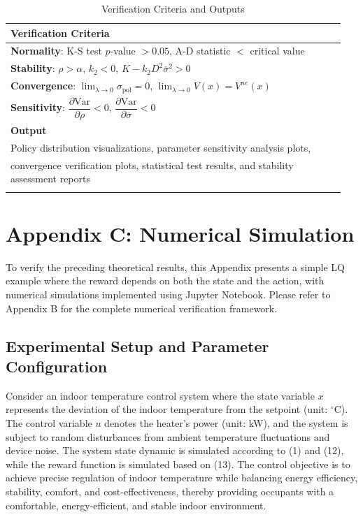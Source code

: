 \documentclass[onecolumn, journal]{IEEEtran} %
\begin{document}
	\newpage
	\begin{table}[h!]
		\centering
		\caption{Verification Criteria and Outputs}
		\label{tab:verification-criteria}
		\footnotesize
		\begin{tabular}{@{}p{0.95\linewidth}@{}}
			\toprule
			\textbf{Verification Criteria}\\
			\midrule
			\textbf{Normality}: K-S test $p$-value $> 0.05$, A-D statistic $<$ critical value\\
			\textbf{Stability}: $\rho > \alpha$, $k_2 < 0$, $K - k_2 D^2 \overline\sigma^2 > 0$\\
			\textbf{Convergence}: $\lim_{\lambda \to 0} \sigma_{\text{pol}} = 0$, $\lim_{\lambda \to 0} V(x) = V^{ne}(x)$\\
			\textbf{Sensitivity}: $\dfrac{\partial \mathrm{Var}}{\partial \rho} < 0$, $\dfrac{\partial \mathrm{Var}}{\partial \overline{\sigma}} < 0$\\
			\midrule
			\textbf{Output}\\
			\midrule
			Policy distribution visualizations, parameter sensitivity analysis plots, \\
			convergence verification plots, statistical test results, and stability assessment reports\\\\
			\bottomrule
		\end{tabular}
	\end{table}
	
	\section*{Appendix C: Numerical Simulation}
	To verify the preceding theoretical results, this Appendix presents a simple LQ example where the reward depends on both the state and the action, with numerical simulations implemented using Jupyter Notebook. Please refer to Appendix B for the complete numerical verification framework.
	
	\subsection{Experimental Setup and Parameter Configuration}
	Consider an indoor temperature control system where the state variable $x$ represents the deviation of the indoor temperature from the setpoint (unit: $^\circ$C). The control variable $u$ denotes the heater's power (unit: kW), and the system is subject to random disturbances from ambient temperature fluctuations and device noise. The system state dynamic is simulated according to (1) and (12), while the reward function is simulated based on (13). The control objective is to achieve precise regulation of indoor temperature while balancing energy efficiency, stability, comfort, and cost-effectiveness, thereby providing occupants with a comfortable, energy-efficient, and stable indoor environment.
	
\end{document}
